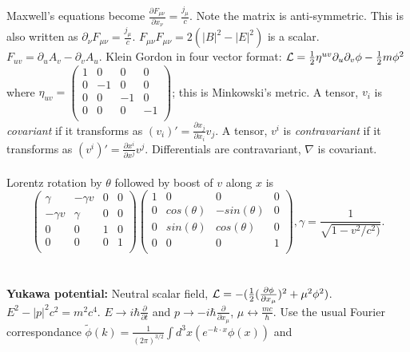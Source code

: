 Maxwell's equations become ${\frac {\partial F_{\mu \nu}} {\partial x_{\nu}}} = {\frac {j_{\mu}} c}$.
Note the matrix is anti-symmetric.
This is also written as $\partial_{\nu} F_{\mu \nu}= {\frac {j_{\mu}} c}$.
$F_{\mu \nu} F_{\mu \nu} = 2(|B|^2-|E|^2)$ is a scalar.  $F_{uv}= \partial_u A_v- \partial_v A_u$.
Klein Gordon in four vector format:
${\cal L}= {\frac 1 2} \eta^{uv} \partial_u \partial_v \phi - {\frac 1 2} m \phi^2$ where
$\eta_{uv}=
\left(
\begin{array}{cccc}
1 & 0 & 0 & 0 \\
0 & -1 & 0 & 0 \\
0 & 0 & -1 & 0 \\
0 & 0 & 0 & -1 \\
\end{array}
\right)
$; this is Minkowski's metric.
A tensor, $v_i$ is \emph{covariant} if it transforms as $(v_i)'= {\frac {\partial x_j} {\partial x_i}} v_j$.
A tensor, $v^i$ is \emph{contravariant} if it transforms as $(v^i)'= {\frac {\partial x^i} {\partial x^j}} v^j$.
Differentials are contravariant, $\nabla$ is covariant.
\\
\\
Lorentz rotation by $\theta$ followed by boost of $v$ along $x$ is
$$
\left(
\begin{array}{cccc}
\gamma & -\gamma v & 0 & 0 \\
-\gamma v & \gamma & 0 & 0 \\
0 & 0 & 1 & 0 \\
0 & 0 & 0 & 1 \\
\end{array}
\right)
\left(
\begin{array}{cccc}
1 & 0 & 0 & 0 \\
0 & cos(\theta) &  -sin(\theta) & 0 \\
0 &  sin(\theta) &  cos(\theta) & 0 \\
0 & 0 & 0 & 1 \\
\end{array}
\right), \gamma= {\frac 1 {\sqrt {1-v^2/c^2)}}}.$$
\\
\\
{\bf Yukawa potential:}  Neutral scalar field, ${\cal L}= - ({\frac 1 2} ({\frac {\partial \phi} {\partial x_{\mu}}})^2
+ \mu^2 \phi^2)$.  $E^2- |p|^2 c^2= m^2 c^4$.  
$E \rightarrow i \hbar {\frac {\partial} {\partial t}}$ and
$p \rightarrow - i \hbar {\frac {\partial} {\partial x_{\mu}}}$, $\mu \leftrightarrow {\frac {mc} {\hbar}}$.
Use the usual Fourier correspondance
$\tilde{\phi}(k)= {\frac 1 {(2 \pi)^{3/2}}} \int d^3 x (e^{- k \cdot x} \phi(x))$ and
